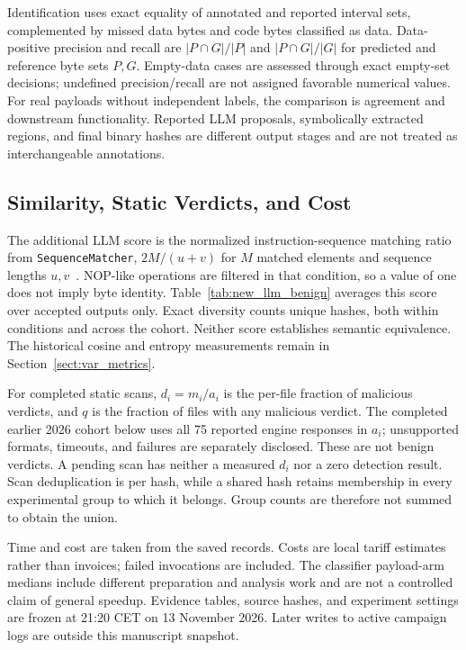 Identification uses exact equality of annotated and reported interval
sets, complemented by missed data bytes and code bytes classified
as data. Data-positive precision and recall are $|P\cap G|/|P|$
and $|P\cap G|/|G|$ for predicted and reference byte sets $P,G$.
Empty-data cases are assessed through exact empty-set decisions;
undefined precision/recall are not assigned favorable numerical values.
For real payloads without independent labels, the comparison is
agreement and downstream functionality. Reported LLM proposals,
symbolically extracted regions, and final binary hashes are different
output stages and are not treated as interchangeable annotations.

\subsection{Similarity, Static Verdicts, and Cost}
The additional LLM score is the normalized instruction-sequence
matching ratio from \texttt{SequenceMatcher}, $2M/(u+v)$ for $M$
matched elements and sequence lengths $u,v$~\cite{python_difflib}.
NOP-like operations are filtered in that condition, so a value of one
does not imply byte identity. Table~\ref{tab:new_llm_benign} averages
this score over accepted outputs only. Exact diversity counts unique
hashes, both within conditions and across the cohort. Neither score
establishes semantic equivalence. The historical cosine and entropy
measurements remain in Section~\ref{sect:var_metrics}.

For completed static scans, $d_i=m_i/a_i$ is the per-file fraction of
malicious verdicts, and $q$ is the fraction of files with any malicious
verdict. The completed earlier 2026 cohort below uses all 75 reported
engine responses in $a_i$; unsupported formats, timeouts, and failures
are separately disclosed. These are not benign verdicts. A pending
scan has neither a measured $d_i$ nor a zero detection result.
Scan deduplication is per hash, while a shared hash retains membership
in every experimental group to which it belongs. Group counts are
therefore not summed to obtain the union.

Time and cost are taken from the saved records. Costs are local tariff
estimates rather than invoices; failed invocations are included.
The classifier payload-arm medians include different preparation and
analysis work and are not a controlled claim of general speedup.
Evidence tables, source hashes, and experiment settings are frozen
at 21:20 CET on 13 November 2026. Later writes to active campaign
logs are outside this manuscript snapshot.

